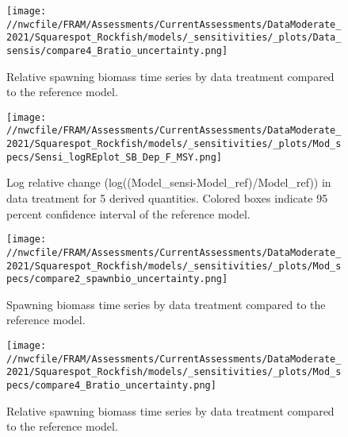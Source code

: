 \documentclass[11pt,
  english,
  a4paper,
]{article}
\begin{document}
\begin{figure}
\centering
\texttt{[image: //nwcfile/FRAM/Assessments/CurrentAssessments/DataModerate\_2021/Squarespot\_Rockfish/models/\_sensitivities/\_plots/Data\_sensis/compare4\_Bratio\_uncertainty.png]}
\caption{Relative spawning biomass time series by data treatment compared to the reference model.\label{fig:sensi-data-depl}}
\end{figure}

\tagmcend\tagstructend


\begin{figure}
\centering
\texttt{[image: //nwcfile/FRAM/Assessments/CurrentAssessments/DataModerate\_2021/Squarespot\_Rockfish/models/\_sensitivities/\_plots/Mod\_specs/Sensi\_logREplot\_SB\_Dep\_F\_MSY.png]}
\caption{Log relative change (log((Model\_sensi-Model\_ref)/Model\_ref)) in data treatment for 5 derived quantities. Colored boxes indicate 95 percent confidence interval of the reference model.\label{fig:sensi-modspec-RE}}
\end{figure}

\tagmcend\tagstructend


\begin{figure}
\centering
\texttt{[image: //nwcfile/FRAM/Assessments/CurrentAssessments/DataModerate\_2021/Squarespot\_Rockfish/models/\_sensitivities/\_plots/Mod\_specs/compare2\_spawnbio\_uncertainty.png]}
\caption{Spawning biomass time series by data treatment compared to the reference model.\label{fig:sensi-modspec-ssb}}
\end{figure}

\tagmcend\tagstructend


\begin{figure}
\centering
\texttt{[image: //nwcfile/FRAM/Assessments/CurrentAssessments/DataModerate\_2021/Squarespot\_Rockfish/models/\_sensitivities/\_plots/Mod\_specs/compare4\_Bratio\_uncertainty.png]}
\caption{Relative spawning biomass time series by data treatment compared to the reference model.\label{fig:sensi-modspec-depl}}
\end{figure}
\end{document}
